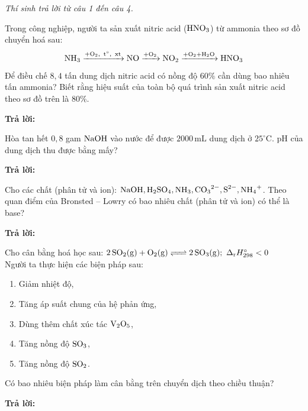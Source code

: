 \documentclass[11pt,a4paper]{article}
\begin{document}
\textit{Thí sinh trả lời từ câu 1 đến câu 4.}
\vspace{4pt}

\begin{ex}%
Trong công nghiệp, người ta sản xuất nitric acid ($\ce{HNO3}$) từ ammonia theo sơ đồ chuyển hoá sau:
$$\ce{NH3 ->[+O_2,\, t^\circ,\, \text{xt}] NO ->[+O_2] NO2 ->[+O_2 + H_2O] HNO3}$$
Để điều chế $8{,}4$ tấn dung dịch nitric acid có nồng độ $60\%$ cần dùng bao nhiêu tấn ammonia? Biết rằng hiệu suất của toàn bộ quá trình sản xuất nitric acid theo sơ đồ trên là $80\%$.

\textbf{Trả lời: } \dotfill

\end{ex}

\begin{ex}%
Hòa tan hết $0{,}8$ gam $\ce{NaOH}$ vào nước để được $2000\,\text{mL}$ dung dịch ở $25^\circ\text{C}$. pH của dung dịch thu được bằng mấy?

\textbf{Trả lời: } \dotfill

\end{ex}

\begin{ex}%
Cho các chất (phân tử và ion): $\ce{NaOH, H2SO4, NH3, CO3^{2-}, S^{2-}, NH4+}$. Theo quan điểm của Bronsted – Lowry có bao nhiêu chất (phân tử và ion) có thể là base?

\textbf{Trả lời: } \dotfill

\end{ex}

\begin{ex}%
Cho cân bằng hoá học sau: $\ce{2SO2(g) + O2(g) <=> 2SO3(g)};\ \Delta_\text{r}H^\circ_{298} < 0$\\
Người ta thực hiện các biện pháp sau:
\begin{enumerate}[label=(\arabic*)]
\item Giảm nhiệt độ,
\item Tăng áp suất chung của hệ phản ứng,
\item Dùng thêm chất xúc tác $\ce{V2O5}$,
\item Tăng nồng độ $\ce{SO3}$,
\item Tăng nồng độ $\ce{SO2}$.
\end{enumerate}
Có bao nhiêu biện pháp làm cân bằng trên chuyển dịch theo chiều thuận?

\textbf{Trả lời: } \dotfill

\end{ex}
\end{document}

